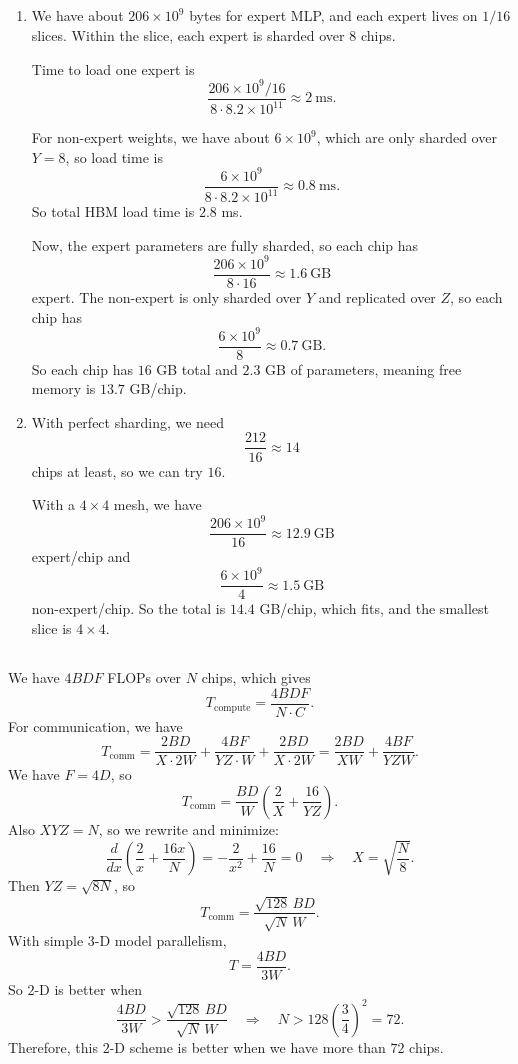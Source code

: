 \documentclass[11pt]{article}
\newcommand{\F}{F}
\newcommand{\ms}{\mathrm{ms}}
\newcommand{\exercisebreak}{\Needspace{8\baselineskip}}
\begin{document}
\subsection{}
\begin{enumerate}
  \item We have about $206\times 10^9$ bytes for expert MLP, and each expert lives on $1/16$ slices. Within the slice, each expert is sharded over $8$ chips.

  Time to load one expert is
  \[
    \frac{206\times 10^9/16}{8\cdot 8.2\times 10^{11}}
    \approx 2\ \ms.
  \]

  For non-expert weights, we have about $6\times 10^9$, which are only sharded over $Y=8$, so load time is
  \[
    \frac{6\times 10^9}{8\cdot 8.2\times 10^{11}}
    \approx 0.8\ \ms.
  \]
  So total HBM load time is $2.8$ ms.

  Now, the expert parameters are fully sharded, so each chip has
  \[
    \frac{206\times 10^9}{8\cdot 16}
    \approx 1.6\ \mathrm{GB}
  \]
  expert. The non-expert is only sharded over $Y$ and replicated over $Z$, so each chip has
  \[
    \frac{6\times 10^9}{8}\approx 0.7\ \mathrm{GB}.
  \]
  So each chip has $16$ GB total and $2.3$ GB of parameters, meaning free memory is $13.7$ GB/chip.

  \item With perfect sharding, we need
  \[
    \frac{212}{16}\approx 14
  \]
  chips at least, so we can try $16$.

  With a $4\times 4$ mesh, we have
  \[
    \frac{206\times 10^9}{16}\approx 12.9\ \mathrm{GB}
  \]
  expert/chip and
  \[
    \frac{6\times 10^9}{4}\approx 1.5\ \mathrm{GB}
  \]
  non-expert/chip. So the total is $14.4$ GB/chip, which fits, and the smallest slice is $4\times 4$.
\end{enumerate}

\exercisebreak
\subsection{}
We have $4BDF$ FLOPs over $N$ chips, which gives
\[
  T_{\mathrm{compute}}=\frac{4BDF}{N\cdot C}.
\]
For communication, we have
\[
  T_{\mathrm{comm}}
  =
  \frac{2BD}{X\cdot 2W}
  +
  \frac{4BF}{YZ\cdot W}
  +
  \frac{2BD}{X\cdot 2W}
  =
  \frac{2BD}{XW}+\frac{4BF}{YZW}.
\]
We have $\F=4D$, so
\[
  T_{\mathrm{comm}}
  =
  \frac{BD}{W}
  \left(\frac{2}{X}+\frac{16}{YZ}\right).
\]
Also $XYZ=N$, so we rewrite and minimize:
\[
  \frac{d}{dx}\left(\frac{2}{x}+\frac{16x}{N}\right)
  =
  -\frac{2}{x^2}+\frac{16}{N}
  =
  0
  \quad\Longrightarrow\quad
  X=\sqrt{\frac{N}{8}}.
\]
Then $YZ=\sqrt{8N}$, so
\[
  T_{\mathrm{comm}}
  =
  \frac{\sqrt{128}\,BD}{\sqrt{N}\,W}.
\]
With simple $3$-D model parallelism,
\[
  T=\frac{4BD}{3W}.
\]
So $2$-D is better when
\[
  \frac{4BD}{3W}
  >
  \frac{\sqrt{128}\,BD}{\sqrt{N}\,W}
  \quad\Longrightarrow\quad
  N>128\left(\frac{3}{4}\right)^2=72.
\]
Therefore, this $2$-D scheme is better when we have more than $72$ chips.
\end{document}
